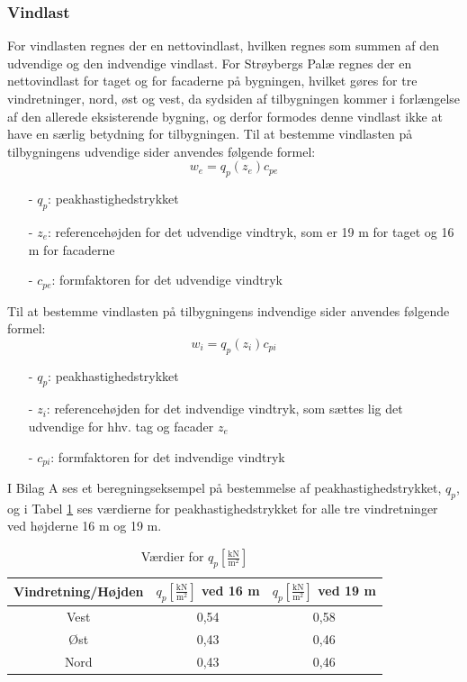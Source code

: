 \subsubsection{Vindlast}
For vindlasten regnes der en nettovindlast, hvilken regnes som summen af den udvendige og den indvendige vindlast.
\newline \indent{     }  For Strøybergs Palæ regnes der en nettovindlast for taget og for facaderne på bygningen, hvilket gøres for tre vindretninger, nord, øst og vest, da sydsiden af tilbygningen kommer i forlængelse af den allerede eksisterende bygning, og derfor formodes denne vindlast ikke at have en særlig betydning for tilbygningen.
\newline
\newline
Til at bestemme vindlasten på tilbygningens udvendige sider anvendes følgende formel:	
\begin{equation} 
	w_e = q_p(z_e)c_{pe}
\end{equation}

\begin{itemize}
	\item[-] $q_p$: peakhastighedstrykket
	\item[-] $z_e$: referencehøjden for det udvendige vindtryk, som er 19 m for taget og 16 m for facaderne
	\item[-] $c_{pe}$: formfaktoren for det udvendige vindtryk
\end{itemize}

Til at bestemme vindlasten på tilbygningens indvendige sider anvendes følgende formel:
\begin{equation} 
	w_i = q_p(z_i)c_{pi}
\end{equation}
\begin{itemize}
	\item[-] $q_p$: peakhastighedstrykket
	\item[-] $z_i$: referencehøjden for det indvendige vindtryk, som sættes lig det udvendige for hhv. tag og facader $z_e$ \citep[ kapitel 7.2.9]{EU91}
	\item[-] $c_{pi}$: formfaktoren for det indvendige vindtryk
\end{itemize}

I Bilag A ses et beregningseksempel på bestemmelse af peakhastighedstrykket, $q_p$, og i Tabel \ref{tab:peak} ses værdierne for peakhastighedstrykket for alle tre vindretninger ved højderne 16 m og 19 m.
\begin{table}[htb]
\begin{center}
	\begin{tabular}{ c c c| } 
		\hline
		Vindretning/Højden & $q_p [\frac{\text{kN}}{\text{m}^2}]$ ved 16 m & $q_p [\frac{\text{kN}}{\text{m}^2}]$ ved 19 m \\	\hline
		Vest & 0,54 & 0,58 \\	
		Øst & 0,43 & 0,46 \\
		Nord & 0,43 & 0,46 \\
	\end{tabular}
		\caption{Værdier for $q_p [\frac{\text{kN}}{\text{m}^2}]$}
		\label{tab:peak}
\end{center}
\end{table}

